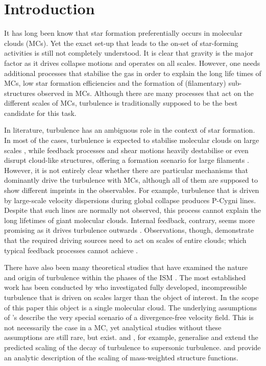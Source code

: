 \section{Introduction}\label{intro}

It has long been know that star formation preferentially occurs in molecular clouds (MCs). 
Yet the exact set-up that leads to the on-set of star-forming activities is still not completely understood.
It is clear that gravity is the major factor as it drives collapse motions and operates on all scales.
However, one needs additional processes that stabilise the gas in order to explain the long life times of MCs, low star formation efficiencies and the formation of (filamentary) sub-structures observed in MCs. 
Although there are many processes that act on the different scales of MCs, turbulence is traditionally supposed to be the best candidate for this task.

In literature, turbulence has an ambiguous role in the context of star formation. 
In most of the cases, turbulence is expected to stabilise molecular clouds on large scales \citep{Fleck1980,McKee1992,MacLow2003}, while feedback processes and shear motions heavily destabilise or even disrupt cloud-like structures, offering a formation scenario for large filaments \citep{Tan2013,Miyamoto2014}. 
However, it is not entirely clear whether there are particular mechanisms that dominantly drive the turbulence with MCs, although all of them are supposed to show different imprints in the observables. 
For example, turbulence that is driven by large-scale velocity dispersions during global collapse \citep{Ballesteros2011a,Ballesteros2011b,Hartmann2012} produces P-Cygni lines. 
Despite that such lines are normally not observed, this process cannot explain the long lifetimes of giant molecular clouds. 
Internal feedback, contrary, seems more promising as it drives turbulence outwards \citep{Dekel2013,Krumholz2014}.
Observations, though, demonstrate that the required driving sources need to act on scales of entire clouds; which typical feedback processes cannot achieve \citep{Brunt2009,Brunt2013,Heyer2004}.

There have also been many theoretical studies that have examined the nature and origin of turbulence within the phases of the ISM \citep[and references within]{MacLow2004}. 
The most established work has been conducted by \citet{Kolmogorov1941} who investigated fully developed, incompressible turbulence that is driven on scales larger than the object of interest.
In the scope of this paper this object is a single molecular cloud. 
The underlying assumptions of \citeauthor{Kolmogorov1941}'s describe the very special scenario of a divergence-free velocity field. 
This is not necessarily the case in a MC, yet analytical studies without these assumptions are still rare, but exist. 
\citet{She1994} and \citet{Boldyrev2002}, for example, generalise and extend the predicted scaling of the decay of turbulence to supersonic turbulence.
\citet{Galtier2011} and \citet{Banerjee2013} provide an analytic description of the scaling of mass-weighted structure functions.

